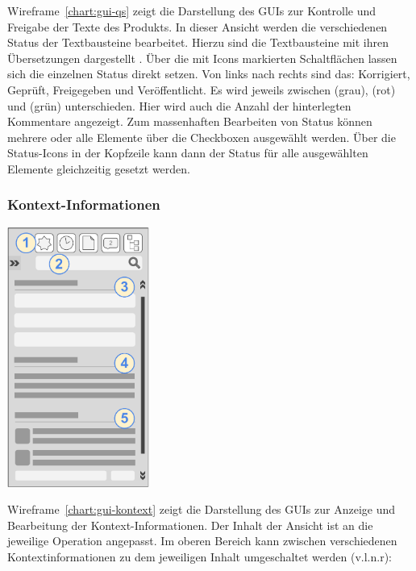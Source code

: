 Wireframe~\ref{chart:gui-qs} zeigt die Darstellung des GUIs zur Kontrolle und Freigabe der Texte des Produkts. In dieser Ansicht werden die verschiedenen Status der Textbausteine bearbeitet. Hierzu sind die Textbausteine mit ihren Übersetzungen dargestellt . Über die mit Icons markierten Schaltflächen  lassen sich die einzelnen Status direkt setzen. Von links nach rechts sind das: Korrigiert, Geprüft, Freigegeben und Veröffentlicht. Es wird jeweils zwischen  (grau),  (rot) und  (grün) unterschieden. Hier wird auch die Anzahl der hinterlegten Kommentare angezeigt. Zum massenhaften Bearbeiten von Status können mehrere oder alle Elemente über die Checkboxen  ausgewählt werden. Über die Status-Icons in der Kopfzeile kann dann der Status für alle ausgewählten Elemente gleichzeitig gesetzt werden.

\pagebreak

\subsubsection{Kontext-Informationen}\label{l:gui-kontext}

\begin{center}
\includegraphics[width=0.35\textwidth]{media/GUIKontext-Informationen.pdf}
\label{chart:gui-kontext}
\end{center}

Wireframe~\ref{chart:gui-kontext} zeigt die Darstellung des GUIs zur Anzeige und Bearbeitung der Kontext-Informationen. Der Inhalt der Ansicht ist an die jeweilige Operation angepasst. Im oberen Bereich kann zwischen verschiedenen Kontextinformationen zu dem jeweiligen Inhalt umgeschaltet werden  (v.l.n.r): 

